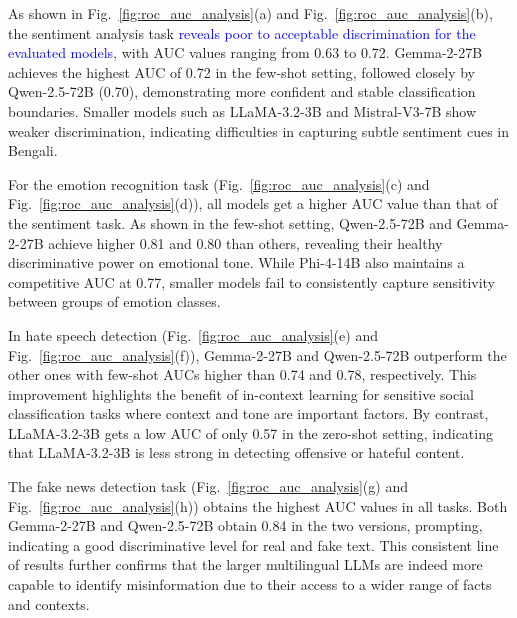 \documentclass[10pt,letterpaper]{article}
\newcommand{\rev}[1]{\textcolor{blue}{#1}}
\begin{document}
As shown in Fig.~\ref{fig:roc_auc_analysis}(a) and Fig.~\ref{fig:roc_auc_analysis}(b), the sentiment analysis task \rev{reveals poor to acceptable discrimination for the evaluated models}, with AUC values ranging from 0.63 to 0.72. Gemma-2-27B achieves the highest AUC of 0.72 in the few-shot setting, followed closely by Qwen-2.5-72B (0.70), demonstrating more confident and stable classification boundaries. Smaller models such as LLaMA-3.2-3B and Mistral-V3-7B show weaker discrimination, indicating difficulties in capturing subtle sentiment cues in Bengali.

For the emotion recognition task (Fig.~\ref{fig:roc_auc_analysis}(c) and Fig.~\ref{fig:roc_auc_analysis}(d)), all models get a higher AUC value than that of the sentiment task. As shown in the few-shot setting, Qwen-2.5-72B and Gemma-2-27B achieve higher 0.81 and 0.80 than others, revealing their healthy discriminative power on emotional tone. While Phi-4-14B also maintains a competitive AUC at 0.77, smaller models fail to consistently capture sensitivity between groups of emotion classes.

In hate speech detection (Fig.~\ref{fig:roc_auc_analysis}(e) and Fig.~\ref{fig:roc_auc_analysis}(f)), Gemma-2-27B and Qwen-2.5-72B outperform the other ones with few-shot AUCs higher than 0.74 and 0.78, respectively. This improvement highlights the benefit of in-context learning for sensitive social classification tasks where context and tone are important factors. By contrast, LLaMA-3.2-3B gets a low AUC of only 0.57 in the zero-shot setting, indicating that LLaMA-3.2-3B is less strong in detecting offensive or hateful content.

The fake news detection task (Fig.~\ref{fig:roc_auc_analysis}(g) and Fig.~\ref{fig:roc_auc_analysis}(h)) obtains the highest AUC values in all tasks. Both Gemma-2-27B and Qwen-2.5-72B obtain 0.84 in the two versions, prompting, indicating a good discriminative level for real and fake text. This consistent line of results further confirms that the larger multilingual LLMs are indeed more capable to identify misinformation due to their access to a wider range of facts and contexts.
\end{document}
